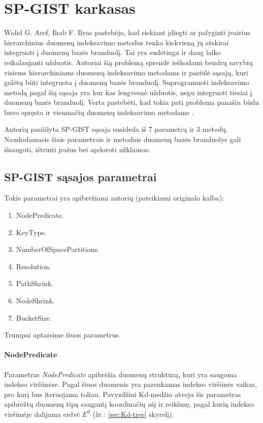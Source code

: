 \section{SP-GIST karkasas}

Walid G. Aref, Ihab F. Ilyas \cite{aref2001sp} pastebėjo, kad siekiant įdiegti ar palyginti įvairius hierarchinius duomenų indeksavimo metodus tenka kiekvieną jų atskirai integruoti į duomenų bazės branduolį.
Tai yra sudėtinga ir daug laiko reikalaujanti užduotis.
Autoriai šią problemą sprendė ieškodami bendrų savybių visiems hierarchiniams duomenų indeksavimo metodams ir pasiūlė sąsają, kuri galėtų būti integruota į duomenų bazės branduolį.
Suprogramuoti indeksavimo metodą pagal šią sąsaja yra kur kas lengvesnė užduotis, negu integruoti tiesiai į duomenų bazės branduolį.
Verta pastebėti, kad tokia pati problema panašiu būdu buvo spręsta ir vienmačių duomenų indeksavimo metodams \cite{hellerstein1995generalized}.

Autorių pasiūlyta SP-GIST sąsaja susideda iš 7 parametrų ir 3 metodų.
Naudodamasis šiais parametrais ir metodais duomenų bazės branduolys gali išsaugoti, ištrinti įrašus bei apdoroti užklausas.

\subsection{SP-GIST sąsajos parametrai}
Tokie parametrai yra apibrėžiami autorių (pateikiami originalo kalba):
\begin{enumerate}
	\item NodePredicate.
	\item KeyType.
	\item NumberOfSpacePartitions.
	\item Resolution.
	\item PathShrink.
	\item NodeShrink.
	\item BucketSize.
\end{enumerate}

Trumpai aptarsime šiuos parametrus.

\paragraph{NodePredicate}
Parametras {\it NodePredicate} apibrėžia duomenų struktūrą, kuri yra saugoma indekso viršūnėse.
Pagal šiuos duomenis yra parenkamas indekso viršūnės vaikas, pro kurį bus iteruojama toliau.
Pavyzdžiui Kd-medžio atveju šis parametras apibrėžtų duomenų tipą saugantį koordinačių ašį ir reikšmę, pagal kurią indekso viršūnėje dalijama erdvė $E^d$ (žr.: \ref{sec:Kd-tree} skyrelį).

